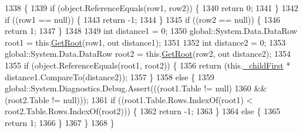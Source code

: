 \begin{DoxyCode}
1338                                                                                                \{
1339                 \textcolor{keywordflow}{if} (\textcolor{keywordtype}{object}.ReferenceEquals(row1, row2)) \{
1340                     \textcolor{keywordflow}{return} 0;
1341                 \}
1342                 \textcolor{keywordflow}{if} ((row1 == null)) \{
1343                     \textcolor{keywordflow}{return} -1;
1344                 \}
1345                 \textcolor{keywordflow}{if} ((row2 == null)) \{
1346                     \textcolor{keywordflow}{return} 1;
1347                 \}
1348 
1349                 \textcolor{keywordtype}{int} distance1 = 0;
1350                 global::System.Data.DataRow root1 = this.\hyperlink{class_proyecto___integrador__3_1_1ds_unidad_table_adapters_1_1_table_adapter_manager_1_1_self_reference_comparer_ad4f17f22d884ae350f82a0213485c822}{GetRoot}(row1, out distance1);
1351 
1352                 \textcolor{keywordtype}{int} distance2 = 0;
1353                 global::System.Data.DataRow root2 = this.\hyperlink{class_proyecto___integrador__3_1_1ds_unidad_table_adapters_1_1_table_adapter_manager_1_1_self_reference_comparer_ad4f17f22d884ae350f82a0213485c822}{GetRoot}(row2, out distance2);
1354 
1355                 \textcolor{keywordflow}{if} (\textcolor{keywordtype}{object}.ReferenceEquals(root1, root2)) \{
1356                     \textcolor{keywordflow}{return} (this.\hyperlink{class_proyecto___integrador__3_1_1ds_unidad_table_adapters_1_1_table_adapter_manager_1_1_self_reference_comparer_a2ca072558bfe3bf9c2f599771b6bafc1}{\_childFirst} * distance1.CompareTo(distance2));
1357                 \}
1358                 \textcolor{keywordflow}{else} \{
1359                     global::System.Diagnostics.Debug.Assert(((root1.Table != null) 
1360                                     && (root2.Table != null)));
1361                     \textcolor{keywordflow}{if} ((root1.Table.Rows.IndexOf(root1) < root2.Table.Rows.IndexOf(root2))) \{
1362                         \textcolor{keywordflow}{return} -1;
1363                     \}
1364                     \textcolor{keywordflow}{else} \{
1365                         \textcolor{keywordflow}{return} 1;
1366                     \}
1367                 \}
1368             \}
\end{DoxyCode}
